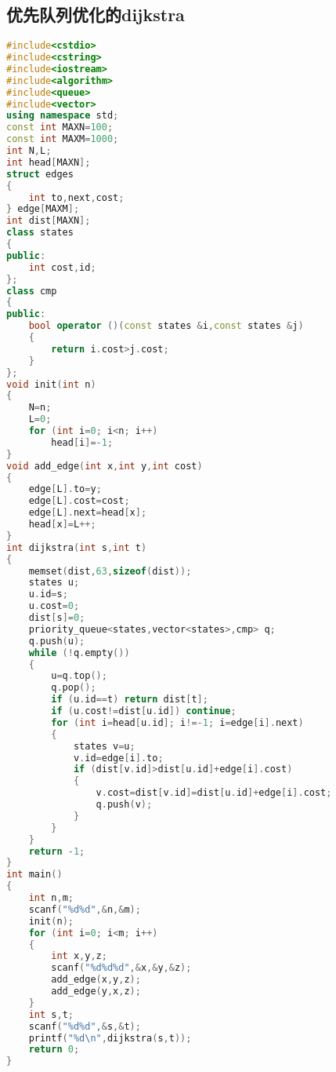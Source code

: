 \subsection{优先队列优化的dijkstra}
	\begin{lstlisting}[language=c++]
#include<cstdio>
#include<cstring>
#include<iostream>
#include<algorithm>
#include<queue>
#include<vector>
using namespace std;
const int MAXN=100;
const int MAXM=1000;
int N,L;
int head[MAXN];
struct edges
{
	int to,next,cost;
} edge[MAXM];
int dist[MAXN];
class states
{
public:
	int cost,id;
};
class cmp
{
public:
	bool operator ()(const states &i,const states &j)
	{
		return i.cost>j.cost;
	}
};
void init(int n)
{
	N=n;
	L=0;
	for (int i=0; i<n; i++)
		head[i]=-1;
}
void add_edge(int x,int y,int cost)
{
	edge[L].to=y;
	edge[L].cost=cost;
	edge[L].next=head[x];
	head[x]=L++;
}
int dijkstra(int s,int t)
{
	memset(dist,63,sizeof(dist));
	states u;
	u.id=s;
	u.cost=0;
	dist[s]=0;
	priority_queue<states,vector<states>,cmp> q;
	q.push(u);
	while (!q.empty())
	{
		u=q.top();
		q.pop();
		if (u.id==t) return dist[t];
		if (u.cost!=dist[u.id]) continue;
		for (int i=head[u.id]; i!=-1; i=edge[i].next)
		{
			states v=u;
			v.id=edge[i].to;
			if (dist[v.id]>dist[u.id]+edge[i].cost)
			{
				v.cost=dist[v.id]=dist[u.id]+edge[i].cost;
				q.push(v);
			}
		}
	}
	return -1;
}
int main()
{
	int n,m;
	scanf("%d%d",&n,&m);
	init(n);
	for (int i=0; i<m; i++)
	{
		int x,y,z;
		scanf("%d%d%d",&x,&y,&z);
		add_edge(x,y,z);
		add_edge(y,x,z);
	}
	int s,t;
	scanf("%d%d",&s,&t);
	printf("%d\n",dijkstra(s,t));
	return 0;
}
	\end{lstlisting}
